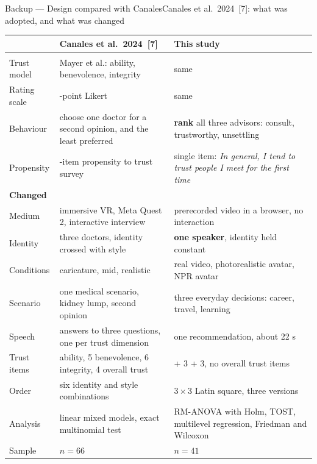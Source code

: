 \documentclass[aspectratio=169,10pt]{beamer}
\newcommand{\hl}[1]{{\color{knblue}\textbf{#1}}}
\newcommand{\good}[1]{{\color{kngreen}\textbf{#1}}}
\begin{document}
\begin{frame}{Backup — Design compared with Canales}{Canales et al.\ 2024~[7]: what was adopted, and what was changed}
  \vspace{0.1em}
  {\tiny
  \setlength{\tabcolsep}{4pt}\renewcommand{\arraystretch}{1.3}
  \begin{tabular}{@{}>{\raggedright\arraybackslash}m{}>{\raggedright\arraybackslash}m{}>{\raggedright\arraybackslash}m{}@{}}
    \toprule
    & \textbf{Canales et al.\ 2024~[7]} & \textbf{This study} \\
    \midrule
    \good{Adopted} & & \\
    Trust model & Mayer et al.: ability, benevolence, integrity & same \\
    Rating scale & 7-point Likert & same \\
    Behaviour & choose one doctor for a second opinion, and the least preferred & \hl{rank} all three advisors: consult, trustworthy, unsettling \\
    Propensity & 7-item propensity to trust survey & single item: \emph{In general, I tend to trust people I meet for the first time} \\
    \midrule
    \hl{Changed} & & \\
    Medium & immersive VR, Meta Quest 2, interactive interview & prerecorded video in a browser, no interaction \\
    Identity & three doctors, identity crossed with style & \hl{one speaker}, identity held constant \\
    Conditions & caricature, mid, realistic & real video, photorealistic avatar, NPR avatar \\
    Scenario & one medical scenario, kidney lump, second opinion & three everyday decisions: career, travel, learning \\
    Speech & answers to three questions, one per trust dimension & one recommendation, about 22 s \\
    Trust items & 5 ability, 5 benevolence, 6 integrity, 4 overall trust & 3 + 3 + 3, no overall trust items \\
    Order & six identity and style combinations & $3\times3$ Latin square, three versions \\
    Analysis & linear mixed models, exact multinomial test & RM-ANOVA with Holm, TOST, multilevel regression, Friedman and Wilcoxon \\
    Sample & $n=66$ & $n=41$ \\
    \bottomrule
  \end{tabular}\par}
\end{frame}
\end{document}
